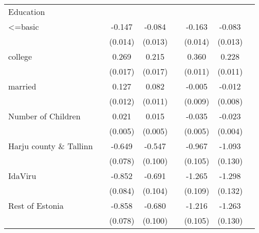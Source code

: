\begin{longtable}{l*{3}{c}|l*{3}{c}}
		Education &&&&&\\
		<=basic             &                     &      -0.147\sym{***}&      -0.084\sym{***}&                     &      -0.163\sym{***}&      -0.083\sym{***}\\
		&                     &     (0.014)         &     (0.013)         &                     &     (0.014)         &     (0.013)         \\
		college             &                     &       0.269\sym{***}&       0.215\sym{***}&                     &       0.360\sym{***}&       0.228\sym{***}\\
		&                     &     (0.017)         &     (0.017)         &                     &     (0.011)         &     (0.011)         \\
		married           &                     &       0.127\sym{***}&       0.082\sym{***}&                     &      -0.005         &      -0.012         \\
		&                     &     (0.012)         &     (0.011)         &                     &     (0.009)         &     (0.008)         \\
		Number of Children         &                     &       0.021\sym{***}&       0.015\sym{**} &                     &      -0.035\sym{***}&      -0.023\sym{***}\\
		&                     &     (0.005)         &     (0.005)         &                     &     (0.005)         &     (0.004)         \\
		Harju county  \& Tallinn      &                     &      -0.649\sym{***}&      -0.547\sym{***}&                     &      -0.967\sym{***}&      -1.093\sym{***}\\
		&                     &     (0.078)         &     (0.100)         &                     &     (0.105)         &     (0.130)         \\
		IdaViru           &                     &      -0.852\sym{***}&      -0.691\sym{***}&                     &      -1.265\sym{***}&      -1.298\sym{***}\\
		&                     &     (0.084)         &     (0.104)         &                     &     (0.109)         &     (0.132)         \\
		Rest of Estonia&                     &      -0.858\sym{***}&      -0.680\sym{***}&                     &      -1.216\sym{***}&      -1.263\sym{***}\\
		&                     &     (0.078)         &     (0.100)         &                     &     (0.105)         &     (0.130)         \\

\end{longtable}
